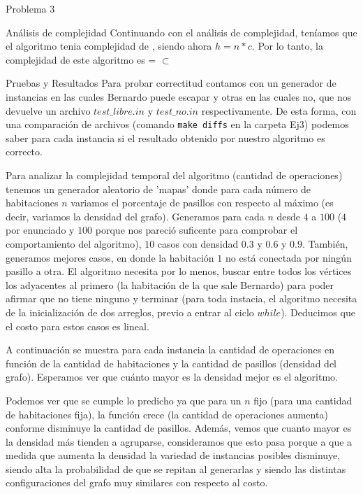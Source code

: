 \begin{section}{Problema 3}
\begin{subsection}{Análisis de complejidad}
		Continuando con el análisis de complejidad, teníamos que el algoritmo tenia complejidad de , siendo ahora $h=n*c$. Por lo tanto, la complejidad de este algoritmo es  =  $\subset$ 
	\end{subsection}


	\begin{subsection}{Pruebas y Resultados}
		Para probar correctitud contamos con un generador de instancias en las cuales Bernardo puede escapar y otras en las cuales no, que nos devuelve un archivo $test\_libre.in$ y $test\_no.in$ respectivamente. De esta forma, con una comparación de archivos (comando \texttt{make diffs} en la carpeta Ej3) podemos saber para cada instancia si el resultado obtenido por nuestro algoritmo es correcto.

		Para analizar la complejidad temporal del algoritmo (cantidad de operaciones) tenemos un generador aleatorio de 'mapas' donde para cada número de habitaciones $n$ variamos el porcentaje de pasillos con respecto al máximo (es decir, variamos la densidad del grafo). Generamos para cada $n$ desde $4$ a $100$ ($4$ por enunciado y $100$ porque nos pareció suficente para comprobar el comportamiento del algoritmo), $10$ casos con densidad $0.3$ y $0.6$ y $0.9$. También, generamos mejores casos, en donde la habitación $1$ no está conectada por ningún pasillo a otra. El algoritmo necesita por lo menos, buscar entre todos los vértices los adyacentes al primero (la habitación de la que sale Bernardo) para poder afirmar que no tiene ninguno y terminar (para toda instacia, el algoritmo necesita de la inicialización de dos arreglos, previo a entrar al ciclo $while$). Deducimos que el costo para estos casos es lineal.

		\newpage

		A continuación se muestra para cada instancia la cantidad de operaciones en función de la cantidad de habitaciones y la cantidad de pasillos (densidad del grafo). Esperamos ver que cuánto mayor es la densidad mejor es el algoritmo.
		

		Podemos ver que se cumple lo predicho ya que para un $n$ fijo (para una cantidad de habitaciones fija), la función crece (la cantidad de operaciones aumenta) conforme disminuye la cantidad de pasillos. 
		Además, vemos que cuanto mayor es la densidad más tienden a agruparse, consideramos que esto pasa porque a que a medida que aumenta la densidad la variedad de instancias posibles disminuye, siendo alta la probabilidad de que se repitan al generarlas y siendo las distintas configuraciones del grafo muy similares con respecto al costo.\VSP


\end{subsection}
\end{section}
